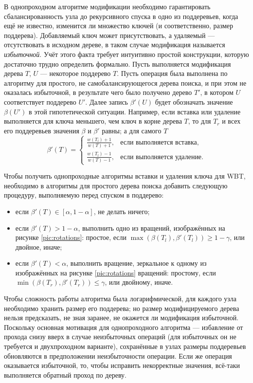 \documentclass[a4paper,14pt]{extarticle}
\begin{document}
В однопроходном алгоритме модификации
необходимо гарантировать
сбалансированность узла до рекурсивного спуска
в одно из поддеревьев,
когда ещё не известно,
изменится ли множество ключей
(и соответственно, размер поддерева).
Добавляемый ключ может присутствовать,
а удаляемый --- отсутствовать в исходном дереве,
в таком случае модификация называется \emph{избыточной}.
Учёт этого факта требует интуитивно простой конструкции,
которую достаточно трудно определить формально.
Пусть выполняется модификация дерева \( T \),
\( U \) --- некоторое поддерево \( T \).
Пусть операция была выполнена
по алгоритму для простого, не самобалансирующегося
дерева поиска, и при этом не оказалась избыточной,
в результате чего было получено
дерево \( T' \), в котором \( U \) соответствует поддерево \( U' \).
Далее запись \( \beta'(U) \) будет обозначать
значение \( \beta(U') \) в этой гипотетической ситуации.
Например, если вставка или удаление выполняется
для ключа меньшего, чем ключ в корне дерева \( T \),
то для \( T_r \) и всех его поддеревьев
значения \( \beta \) и \( \beta' \) равны;
а для самого \( T \)
\begin{equation}
  \beta'(T) = \begin{cases}
    \frac{w(T_l) + 1}{w(T) + 1}, & \text{если выполняется вставка,} \\
    \frac{w(T_l) - 1}{w(T) - 1}, & \text{если выполняется удаление.}
  \end{cases}
\end{equation}

Чтобы получить однопроходные алгоритмы
вставки и удаления ключа для WBT,
необходимо в алгоритмы для простого дерева поиска
добавить следующую процедуру,
выполняемую перед спуском в поддерево:
\begin{itemize}
  \item если \( \beta'(T) \in [\alpha, 1 - \alpha] \),
    не делать ничего;
  \item если \( \beta'(T) > 1 - \alpha \),
    выполнить одно из вращений,
    изображённых на рисунке \ref{pic:rotations}:
    простое, если \( \max(\beta(T_l), \beta'(T_l)) \geqslant 1 - \gamma \),
    или двойное, иначе;
  \item если \( \beta'(T) < \alpha \),
    выполнить вращение, зеркальное
    к одному из изображённых на
    рисунке \ref{pic:rotations} вращений:
    простому, если \( \min(\beta(T_r), \beta'(T_r)) \leqslant \gamma \),
    или двойному, иначе.
\end{itemize}

Чтобы сложность работы алгоритма была логарифмической,
для каждого узла необходимо хранить размер его поддерева;
но размер модифицируемого дерева нельзя предсказать,
не зная заранее, не окажется ли модификация избыточной.
Поскольку основная мотивация для однопроходного алгоритма ---
избавление от прохода снизу вверх в случае
неизбыточных операций (для избыточных он не требуется и двухпроходном варианте),
сохранённые в узлах размеры поддеревьев обновляются
в предположении неизбыточности операции.
Если же операция оказывается избыточной,
то, чтобы исправить некорректные значения,
всё-таки выполняется обратный проход по дереву.
\end{document}
